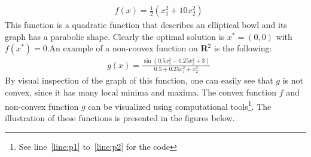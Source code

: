 \begin{equation*}\label{eq:10}\tag{1.4}
\begin{aligned}
    &f(x) = \frac{1}{2}(x_{1}^{2} + 10x_{2}^{2})
\end{aligned}
\end{equation*}
This function is a quadratic function that describes an elliptical bowl and its graph has a parabolic shape.
Clearly the optimal solution is $x^{*} = (0,0)$ with $f(x^{*}) = 0$.\newpage An example of a non-convex function on $\mathbf{R}^2$ is the following: 
\begin{equation*}\label{eq:11}\tag{1.5}
\begin{aligned}
    &g(x) = \frac{\sin\left(0.5x_1^2 - 0.25x_2^2 + 3\right)}{0.5 + 0.25x_1^2 + x_2^2}
\end{aligned}
\end{equation*}
By visual inspection of the graph of this function, one can easily see that $g$ is not convex, since it has many local minima and maxima. The convex function $f$ and non-convex function $g$ can be visualized using computational tools\footnote{See line~\ref{line:p1} to~\ref{line:p2} for the code}. The illustration of these functions is presented in the figures below.

